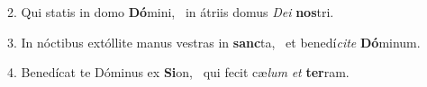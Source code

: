 2. Qui statis in domo \textbf{Dó}mini, \ast\  in átriis domus \textit{De}\textit{i} \textbf{nos}tri.\

3. In nóctibus extóllite manus vestras in \textbf{sanc}ta, \ast\  et benedí\textit{ci}\textit{te} \textbf{Dó}minum.\

4. Benedícat te Dóminus ex \textbf{Si}on, \ast\  qui fecit cæ\textit{lum} \textit{et} \textbf{ter}ram.\

